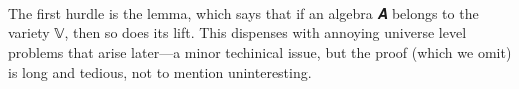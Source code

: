 \documentclass[a4paper,UKenglish,cleveref,autoref,thm-restate]{lipics-v2021}
\begin{document}
\begin{code}
\AgdaSpace{}%
\AgdaSpace{}%
\AgdaSymbol{:}\AgdaSpace{}%
\<%
\\
%
\>[1]\AgdaSpace{}%
\AgdaSymbol{=}\AgdaSpace{}%
\AgdaSpace{}%
\AgdaSpace{}%
\AgdaSpace{}%
\AgdaSpace{}%
\AgdaSpace{}%
\<%
\\
%
\>[1]\AgdaSpace{}%
\AgdaSymbol{=}\AgdaSpace{}%
\AgdaSpace{}%
\<%
\\
%
\>[1]\AgdaSpace{}%
\AgdaSymbol{=}\AgdaSpace{}%
\AgdaSpace{}%
\AgdaSpace{}%
\<%
\end{code}
\ccpad
The first hurdle is the  lemma, which says that if an algebra \ab 𝑨 belongs to the variety 𝕍, then so does its lift. This dispenses with annoying universe level problems that arise later---a minor techinical issue, but the proof (which we omit) is long and tedious, not to mention uninteresting.
\ccpad
\begin{code}%
\>[1]\AgdaSpace{}%
\<%
\\
%
\>[1]\AgdaSpace{}%
\<%
\\
\>[1][@{}l@{\AgdaIndent{0}}]%
\>[2]\AgdaSpace{}%
\AgdaSymbol{:}\AgdaSpace{}%
\AgdaSymbol{\{}\AgdaSpace{}%
\AgdaSymbol{:}\AgdaSpace{}%
\AgdaSpace{}%
\AgdaSpace{}%
\AgdaSymbol{\}}\<%
\\
\>[2][@{}l@{\AgdaIndent{0}}]%
\>[3]%
\>[9]\AgdaSpace{}%
\AgdaSpace{}%
\AgdaSymbol{\{}\AgdaSymbol{\}\{}\AgdaSymbol{\}}\AgdaSpace{}%
\<%
\\
\>[3][@{}l@{\AgdaIndent{0}}]%
\>[7]\AgdaComment{---------------------------------}\<%
\\
%
\>[3]%
\>[8]\AgdaSpace{}%
\AgdaSpace{}%
\AgdaSpace{}%
\AgdaSpace{}%
\AgdaSymbol{\{}\AgdaSymbol{\}\{}\AgdaSymbol{\}}\AgdaSpace{}%
\<%
\end{code}
\ccpad
\end{document}
